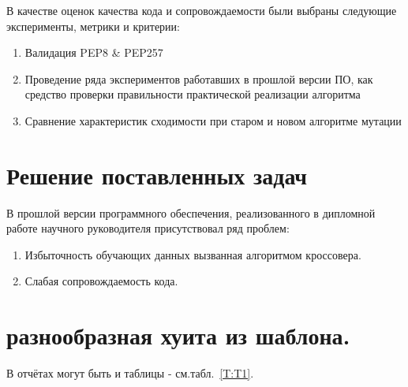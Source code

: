 \documentclass[utf8,usehyperref,12pt]{G7-32}
\begin{document}

В качестве оценок качества кода и сопровождаемости были выбраны следующие эксперименты, метрики и критерии:
\begin{enumerate}
\item Валидация PEP8 \& PEP257
\item Проведение ряда экспериментов работавших в прошлой версии ПО, как средство проверки правильности практической реализации алгоритма
\item Сравнение характеристик сходимости при старом и новом алгоритме мутации
\end{enumerate}

\chapter{Решение поставленных задач}
В прошлой версии программного обеспечения, реализованного в дипломной работе научного руководителя присутствовал ряд проблем:
\begin{enumerate}
\item Избыточность обучающих данных вызванная алгоритмом кроссовера.
\item Слабая сопровождаемость кода.
\end{enumerate}
\chapter{разнообразная хуита из шаблона.}


В отчётах могут быть и таблицы - см.табл.~\ref{T:T1}.
\end{document}
